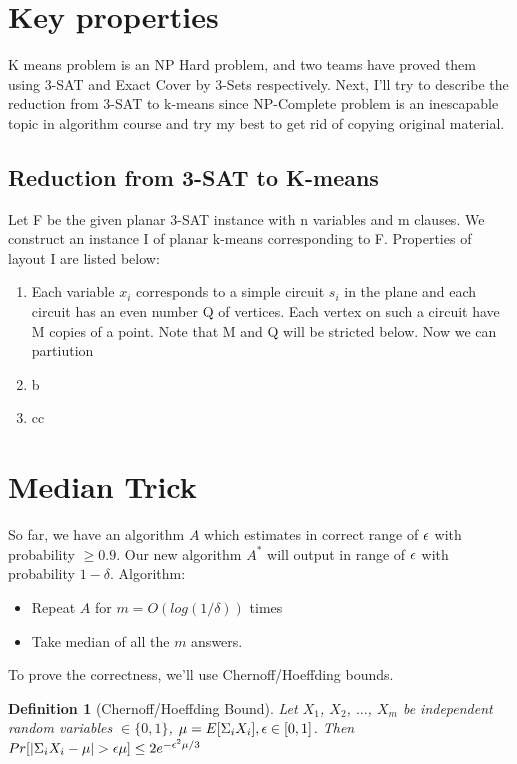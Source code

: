 \documentclass[11pt]{article}
\newtheorem{definition}[theorem]{Definition}
\def\eps{\ensuremath\epsilon}
\begin{document}
\section{Key properties}
K means problem is an NP Hard problem, and two teams have proved them using 3-SAT and Exact Cover by 3-Sets respectively.\cite{npc-prove,Vattani_thehardness} Next, I'll try to describe the reduction from 3-SAT to k-means since NP-Complete problem is an inescapable topic in algorithm course and try my best to get rid of copying original material.
\subsection{Reduction from 3-SAT to K-means}
Let {F} be the given planar 3-SAT instance with n variables and m clauses. We construct an instance I of planar k-means corresponding to F. Properties of layout I are listed below:
\begin{enumerate}
\item Each variable $x_i$ corresponds to a simple circuit $s_i$ in the plane and each circuit has an even number Q of vertices. Each vertex on such a circuit have M copies of a point. Note that M and Q will be stricted below. Now we can partiution
\item b
\item cc
\end{enumerate}


\section{Median Trick}
So far, we have an algorithm $A$ which estimates in correct range of $\eps$ with probability $\ge 0.9$. Our new algorithm $A^{\ast}$ will output in range of $\eps$ with probability $1-\delta$.
Algorithm:
\begin{itemize}
\item Repeat $A$ for $m=O(log (1/\delta))$ times
\item Take median of all the $m$ answers.
\end{itemize}

To prove the correctness, we'll use Chernoff/Hoeffding bounds.

\begin{definition}
[Chernoff/Hoeffding Bound]
Let $X_{1}$, $X_{2}$, $\ldots$, $X_{m}$ be independent random variables $\in \{0,1\}$,
$\mu = E[\Sigma_{i} X_{i}], \eps \in [0,1]$.
Then $Pr[|\Sigma_{i} X_{i}-\mu| > \eps\mu] \leq 2e^{-\eps^{2}\mu/3}$
\end{definition}
\end{document}

